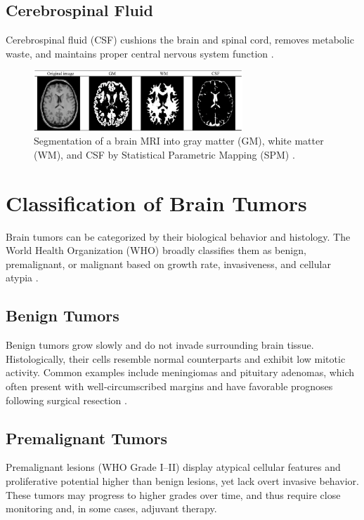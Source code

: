 \subsection*{Cerebrospinal Fluid}
Cerebrospinal fluid (CSF) cushions the brain and spinal cord, removes metabolic waste, and maintains proper central nervous system function \cite{ref6}.

\begin{figure}[ht]
      \centering
      \includegraphics[width=0.7\textwidth]{Images/Chapter0/parts.png}
      \caption{Segmentation of a brain MRI into gray matter (GM), white matter (WM), and CSF by Statistical Parametric Mapping (SPM) \cite{ref7}.}
      \label{fig:spm-segmentation}
\end{figure}

\section{Classification of Brain Tumors}
\label{sec:classification-brain-tumors}

Brain tumors can be categorized by their biological behavior and histology. The World Health Organization (WHO) broadly classifies them as benign, premalignant, or malignant based on growth rate, invasiveness, and cellular atypia \cite{ref8}.

\subsection{Benign Tumors}
Benign tumors grow slowly and do not invade surrounding brain tissue. Histologically, their cells resemble normal counterparts and exhibit low mitotic activity. Common examples include meningiomas and pituitary adenomas, which often present with well‐circumscribed margins and have favorable prognoses following surgical resection \cite{ref8}.

\subsection{Premalignant Tumors}
Premalignant lesions (WHO Grade I–II) display atypical cellular features and proliferative potential higher than benign lesions, yet lack overt invasive behavior. These tumors may progress to higher grades over time, and thus require close monitoring and, in some cases, adjuvant therapy.

